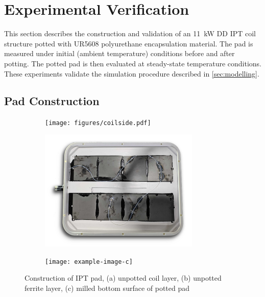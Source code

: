 \documentclass[conference]{IEEEtran}
\begin{document}
\lipsum[2]

\section{Experimental Verification}

This section describes the construction and validation of an \SI{11}{\kilo\watt} DD IPT coil structure potted with UR5608 polyurethane encapsulation material. 
The pad is measured under initial (ambient temperature) conditions before and after potting. 
The potted pad is then evaluated at steady-state temperature conditions. 
These experiments validate the simulation procedure described in \cref{sec:modelling}. 

\subsection{Pad Construction}

\lipsum[2]

\begin{figure}
  \centering
  \begin{subfigure}{\columnwidth}
    \centering
    \texttt{[image: figures/coilside.pdf]}
    \caption{}
  \end{subfigure}
  \vspace{1em}

  \begin{subfigure}{\columnwidth}
    \centering
    \includegraphics[width=3in]{figures/ferriteside.pdf}
    \caption{}
  \end{subfigure}
  \vspace{1em}

  \begin{subfigure}{\columnwidth}
    \centering
    \texttt{[image: example-image-c]}
    \caption{}
  \end{subfigure}

  \caption{Construction of IPT pad, (a) unpotted coil layer, (b) unpotted ferrite layer, (c) milled bottom surface of potted pad}
\end{figure}
\end{document}
